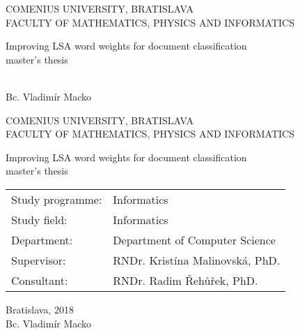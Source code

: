 \documentclass[12pt, oneside]{book}
\theoremstyle{definition}
\def\mfrok{2018}
\def\mfnazov{Improving LSA word weights for document classification}
\def\mftyp{master's thesis}
\def\mfautor{Bc. Vladimír Macko}
\def\mfskolitel{RNDr. Kristína Malinovská, PhD.}
\def\mfkonzultant{RNDr. Radim Řehůřek, PhD.}
\def\mfmiesto{Bratislava, \mfrok}
\def\mfodbor{ Informatics }
\def\program{ Informatics }
\def\mfpracovisko{ Department of Computer Science }
\begin{document}
     

\thispagestyle{empty}

\begin{center}
\sc\large
COMENIUS UNIVERSITY, BRATISLAVA\\
FACULTY OF MATHEMATICS, PHYSICS AND INFORMATICS

\vfill

{\LARGE\mfnazov}\\
\mftyp
\end{center}

\vfill

{\sc\large 
\noindent \mfrok\\
\mfautor
}

\eject %


\thispagestyle{empty}
\noindent

\begin{center}
\sc  
\large
COMENIUS UNIVERSITY, BRATISLAVA\\
FACULTY OF MATHEMATICS, PHYSICS AND INFORMATICS

\vfill

{\LARGE\mfnazov}\\
\mftyp
\end{center}

\vfill

\noindent
\begin{tabular}{ll}
Study programme: & \program \\
Study field: & \mfodbor \\
Department: & \mfpracovisko \\
Supervisor: & \mfskolitel \\
Consultant: & \mfkonzultant \\
\end{tabular}

\vfill


\noindent \mfmiesto\\
\mfautor

\eject %





\newpage 
\thispagestyle{empty}

\end{document}
